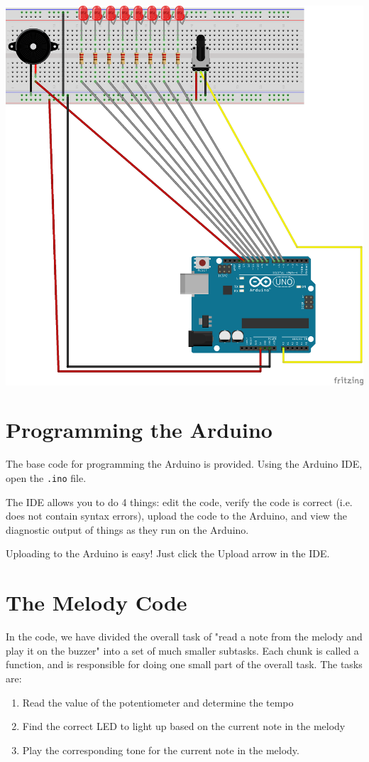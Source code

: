 \documentclass[11pt]{article}
\begin{document}
\includegraphics[width=.9\linewidth]{./exp5-strobe-melody_bb.png}

\section{Programming the Arduino}
\label{sec-4}

The base code for programming the Arduino is provided. Using the Arduino IDE, open the \texttt{.ino} file.

The IDE allows you to do 4 things: edit the code, verify the code is correct (i.e. does not contain syntax
errors), upload the code to the Arduino, and view the diagnostic output of things as they run on the Arduino.

Uploading to the Arduino is easy! Just click the Upload arrow in the IDE.

\section{The Melody Code}
\label{sec-5}

In the code, we have divided the overall task of "read a note from the melody and play it on the buzzer" into a set of
much smaller subtasks. Each chunk is called a function, and is responsible for doing one small part of the overall
task. The tasks are:

\begin{enumerate}
\item Read the value of the potentiometer and determine the tempo
\item Find the correct LED to light up based on the current note in the melody
\item Play the corresponding tone for the current note in the melody.
\end{enumerate}
\end{document}
